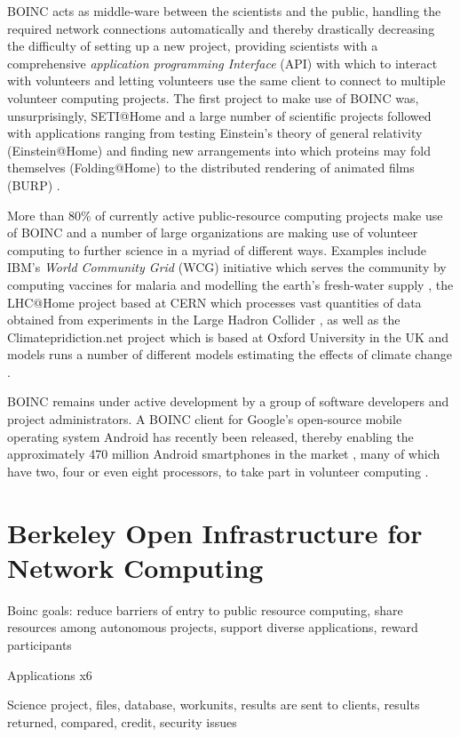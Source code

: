 BOINC acts as middle-ware between the scientists and the public, handling the required network connections automatically and thereby drastically decreasing the difficulty of setting up a new project, providing scientists with a comprehensive \emph{application programming Interface} (API) with which to interact with volunteers and letting volunteers use the same client to connect to multiple volunteer computing projects. The first project to make use of BOINC was, unsurprisingly, SETI@Home and a large number of scientific projects followed with applications ranging from testing Einstein's theory of general relativity (Einstein@Home) \cite{eah} and finding new arrangements into which proteins may fold themselves (Folding@Home) \cite{fah} to the distributed rendering of animated films (BURP) \cite{burp}.

More than 80\% of currently active public-resource computing projects make use of BOINC  and a number of large organizations are making use of volunteer computing to further science in a myriad of different ways. Examples include IBM's \emph{World Community Grid} (WCG) initiative which serves the community by computing vaccines for malaria and modelling the earth's fresh-water supply \cite{wcg}, the LHC@Home project based at CERN which processes vast quantities of data obtained from experiments in the Large Hadron Collider \cite{lhcah}, as well as the Climatepridiction.net project which is based at Oxford University in the UK and models runs a number of different models estimating the effects of climate change \cite{cpdn}.

BOINC remains under active development by a group of software developers and project administrators. A BOINC client for Google's open-source mobile operating system Android has recently been released, thereby enabling the approximately 470 million Android smartphones in the market \cite{mobithinking}, many of which have two, four or even eight processors,      to take part in volunteer computing \cite{android}.

\section{Berkeley Open Infrastructure for Network Computing}
Boinc goals: reduce barriers of entry to public resource computing, share resources among autonomous projects, support diverse applications, reward participants

Applications \cite{anderson:pc} x6

Science project, files, database, workunits, results are sent to clients, results returned, compared, credit,  security issues
